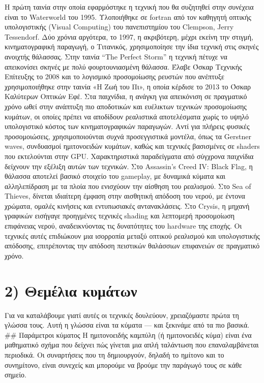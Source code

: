 \documentclass[
  a4paper,
  11pt,
]{article}
\begin{document}
Η πρώτη ταινία στην οποία εφαρμόστηκε η τεχνική που θα συζητηθεί στην
συνέχεια είναι το Waterworld του 1995. Υλοποιήθηκε σε fortran από τον
καθηγητή οπτικής υπολογιστικής (Visual Computing) του πανεπιστημίου του
Clempson, Jerry Tessendorf. Δύο χρόνια αργότερα, το 1997, η ακριβότερη,
μέχρι εκείνη την στιγμή, κινηματογραφική παραγωγή, ο Τιτανικός,
χρησιμοποίησε την ίδια τεχνική στις σκηνές ανοιχτής θάλασσας. Στην
ταινία ``The Perfect Storm'' η τεχνική πέτυχε να απεικονίσει σκηνές με
πολύ φουρτουνιασμένη θάλασσα. Έλαβε Όσκαρ Τεχνικής Επίτευξης το 2008 και
το λογισμικό προσομοίωσης ρευστών που ανέπτυξε χρησιμοποιήθηκε στην
ταινία «Η Ζωή του Πι», η οποία κέρδισε το 2013 το Όσκαρ Καλύτερων
Οπτικών Εφέ. Στα παιχνίδια, η ανάγκη για απεικόνιση σε πραγματικό χρόνο
ωθεί στην ανάπτυξη πιο αποδοτικών και ευέλικτων τεχνικών προσομοίωσης
κυμάτων, οι οποίες πρέπει να αποδίδουν ρεαλιστικά αποτελέσματα χωρίς το
υψηλό υπολογιστικό κόστος των κινηματογραφικών παραγωγών. Αντί για
πλήρεις φυσικές προσομοιώσεις, χρησιμοποιούνται συχνά προσεγγιστικά
μοντέλα, όπως τα Gerstner waves, συνδυασμοί ημιτονοειδών κυμάτων, καθώς
και τεχνικές βασισμένες σε shaders που εκτελούνται στην GPU.
Χαρακτηριστικά παραδείγματα από σύγχρονα παιχνίδια δείχνουν την εξέλιξη
αυτών των τεχνικών. Στο Assassin's Creed IV: Black Flag, η θάλασσα
αποτελεί βασικό στοιχείο του gameplay, με δυναμικά κύματα και
αλληλεπίδραση με τα πλοία που ενισχύουν την αίσθηση του ρεαλισμού. Στο
Sea of Thieves, δίνεται ιδιαίτερη έμφαση στην αισθητική απόδοση του
νερού, με έντονα χρώματα, ομαλές κινήσεις και εντυπωσιακές
αντανακλάσεις. Στο Crysis, η μηχανή γραφικών εισήγαγε προηγμένες
τεχνικές shading και λεπτομερή προσομοίωση επιφάνειας νερού,
αναδεικνύοντας τις δυνατότητες του hardware της εποχής. Οι τεχνικές
αυτές επιδιώκουν μια ισορροπία μεταξύ οπτικού ρεαλισμού και
υπολογιστικής απόδοσης, επιτρέποντας την απόδοση πειστικών θαλάσσιων
επιφανειών σε πραγματικό χρόνο.

\section{2) Θεμέλια
κυμάτων}\label{ux3b8ux3b5ux3bcux3adux3bbux3b9ux3b1-ux3baux3c5ux3bcux3acux3c4ux3c9ux3bd}

Για να καταλάβουμε γιατί αυτές οι τεχνικές δουλεύουν, χρειαζόμαστε πρώτα
τη γλώσσα τους. Αυτή η γλώσσα είναι τα κύματα --- και ξεκινάμε από τα
πιο βασικά. \#\# Παράμετροι κύματος Η ημιτονοειδής καμπύλη (ή
ημιτονοειδές κύμα) είναι ένα μαθηματικό σχήμα που δείχνει πώς γίνεται
μια απλή ταλάντωση που επαναλαμβάνεται περιοδικά. Οι συναρτήσεις που τη
δημιουργούν, δηλαδή το ημίτονο και το συνημίτονο, είναι συνεχείς και
μπορούμε να βρούμε την παράγωγό τους σε κάθε σημείο.
\end{document}
